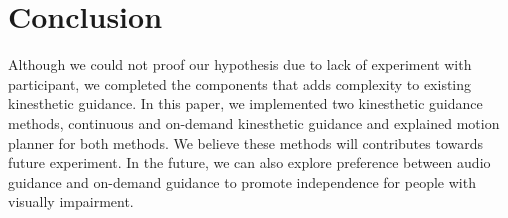 \section{Conclusion}
Although we could not proof our hypothesis due to lack of experiment with participant, we completed the components that adds complexity to existing kinesthetic guidance. In this paper, we implemented two kinesthetic guidance methods, continuous and on-demand kinesthetic guidance and explained motion planner for both methods. We believe these methods will contributes towards future experiment. In the future, we can also explore preference between audio guidance and on-demand guidance to promote independence for people with visually impairment. 


\cite{FinalVideo}

